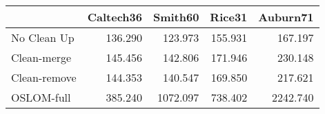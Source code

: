 \begin{tabular}{lrrrr}
\toprule
{} & Caltech36 &  Smith60 &  Rice31 & Auburn71 \\
\midrule
No Clean Up  &   136.290 &  123.973 & 155.931 &  167.197 \\
Clean-merge  &   145.456 &  142.806 & 171.946 &  230.148 \\
Clean-remove &   144.353 &  140.547 & 169.850 &  217.621 \\
OSLOM-full   &   385.240 & 1072.097 & 738.402 & 2242.740 \\
\bottomrule
\end{tabular}
